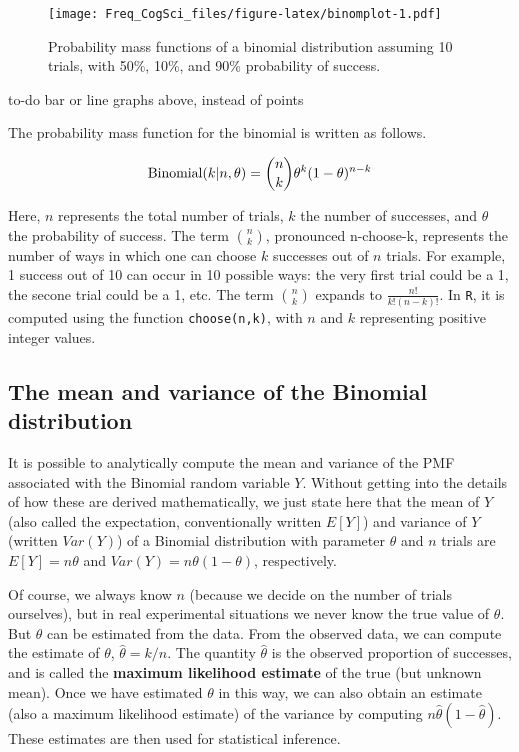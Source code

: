 \documentclass[12pt,]{krantz}
\makeatletter
\newenvironment{kframe}{%
\medskip{}
\setlength{\fboxsep}{.8em}
 \def\at@end@of@kframe{}%
 \ifinner\ifhmode%
  \def\at@end@of@kframe{\end{minipage}}%
  \begin{minipage}{\columnwidth}%
 \fi\fi%
 \def\FrameCommand##1{\hskip\@totalleftmargin \hskip-\fboxsep
 \colorbox{shadecolor}{##1}\hskip-\fboxsep
     \hskip-\linewidth \hskip-\@totalleftmargin \hskip\columnwidth}%
 \MakeFramed {\advance\hsize-\width
   \@totalleftmargin\z@ \linewidth\hsize
   \@setminipage}}%
 {\par\unskip\endMakeFramed%
 \at@end@of@kframe}
\newenvironment{rmdblock}[1]
  {
  \begin{itemize}
  \renewcommand{\labelitemi}{
    \raisebox{-.7\height}[0pt][0pt]{
      {\setkeys{Gin}{width=3em,keepaspectratio}\texttt{[image: images/\#1]}}
    }
  }
  \setlength{\fboxsep}{1em}
  \begin{kframe}
  \item
  }
  {
  \end{kframe}
  \end{itemize}
  }
\newenvironment{rmdnote}
  {\begin{rmdblock}{note}}
  {\end{rmdblock}}
\makeatother
\begin{document}
\begin{figure}
\centering
\texttt{[image: Freq\_CogSci\_files/figure-latex/binomplot-1.pdf]}
\caption{\label{fig:binomplot}Probability mass functions of a binomial distribution assuming 10 trials, with 50\%, 10\%, and 90\% probability of success.}
\end{figure}

\begin{rmdnote}
to-do bar or line graphs above, instead of points
\end{rmdnote}

The probability mass function for the binomial is written as follows.

\begin{equation}
\hbox{Binomial}(k|n,\theta) = 
\binom{n}{k} \theta^{k} (1-\theta)^{n-k}
\end{equation}

Here, \(n\) represents the total number of trials, \(k\) the number of successes, and \(\theta\) the probability of success. The term \(\binom{n}{k}\), pronounced n-choose-k, represents the number of ways in which one can choose \(k\) successes out of \(n\) trials. For example, 1 success out of 10 can occur in 10 possible ways: the very first trial could be a 1, the secone trial could be a 1, etc.
The term \(\binom{n}{k}\) expands to \(\frac{n!}{k!(n-k)!}\). In \texttt{R}, it is computed using the function \texttt{choose(n,k)}, with \(n\) and \(k\) representing positive integer values.

\hypertarget{the-mean-and-variance-of-the-binomial-distribution}{%
\subsection{The mean and variance of the Binomial distribution}\label{the-mean-and-variance-of-the-binomial-distribution}}

It is possible to analytically compute the mean and variance of the PMF associated with the Binomial random variable \(Y\). Without getting into the details of how these are derived mathematically, we just state here that the mean of \(Y\) (also called the expectation, conventionally written \(E[Y]\)) and variance of \(Y\) (written \(Var(Y)\)) of a Binomial distribution with parameter \(\theta\) and \(n\) trials are \(E[Y] = n\theta\) and \(Var(Y) = n\theta (1-\theta)\), respectively.

Of course, we always know \(n\) (because we decide on the number of trials ourselves), but in real experimental situations we never know the true value of \(\theta\). But \(\theta\) can be estimated from the data. From the observed data, we can compute the estimate of \(\theta\), \(\hat \theta=k/n\). The quantity \(\hat \theta\) is the observed proportion of successes, and is called the \textbf{maximum likelihood estimate} of the true (but unknown mean). Once we have estimated \(\theta\) in this way, we can also obtain an estimate (also a maximum likelihood estimate) of the variance by computing \(n\hat\theta (1-\hat\theta)\). These estimates are then used for statistical inference.
\end{document}
